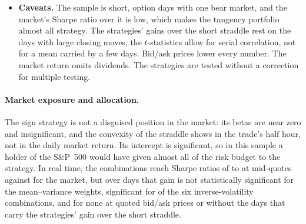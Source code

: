 \begin{itemize}
\begin{itemize}
    the short straddle earns on ordinary days, in line with Table~\ref{tab:rh_econ_bestdays}.
  \item In real time no combination is significantly above the market (mean--variance \rhebExRtMvFullMin{} to
    \rhebExRtMvFullMax, inverse volatility \rhebExRtIvFullMin{} to \rhebExRtIvFullMax, against \rhebSRmExRt).
  \end{itemize}
\item \textbf{Caveats.} The sample is short, \rheSzDays{} option days with one bear market, and the market's Sharpe
  ratio over it is low, which makes the tangency portfolio almost all strategy. The strategies' gains over the short
  straddle rest on the \rhebNBest{} days with large closing moves; the $t$-statistics allow for serial correlation, not
  for a mean carried by a few days. Bid/ask prices lower every number. The market return omits dividends. The
  strategies are tested without a correction for multiple testing.
\end{itemize}

\paragraph{Market exposure and allocation.} The sign strategy is not a disguised position in the market: its betas
are near zero and insignificant, and the convexity of the straddle shows in the trade's half hour, not in the daily
market return. Its intercept is significant, so in this sample a holder of the S\&P~500 would have given almost all of
the risk budget to the strategy. In real time, the combinations reach Sharpe ratios of \rhebRtIvFullMin{} to
\rhebRtMvFullMax{} at mid-quotes against \rhebSRmRt{} for the market, but over \rhebNRt{} days that gain is not
statistically significant for the mean--variance weights, significant for \rhebRtIvSigFullWord{} of the six
inverse-volatility combinations, and for none at quoted
bid/ask prices or without the \rhebNBest{} days that carry the strategies' gain over the short straddle.
